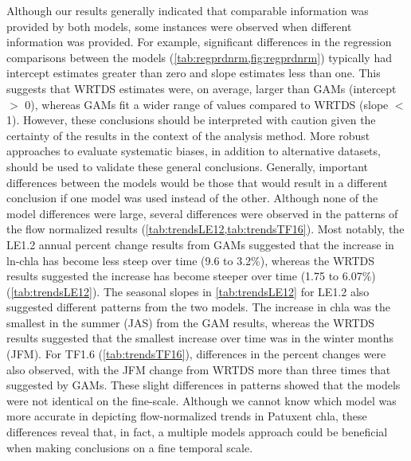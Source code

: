 \documentclass[letterpaper,12pt,oneside]{article}\usepackage[]{graphicx}\usepackage[]{color}
\begin{document}
Although our results generally indicated that comparable information was provided by both models, some instances were observed when different information was provided.  For example, significant differences in the regression comparisons between the models (\cref{tab:regprdnrm,fig:regprdnrm}) typically had intercept estimates greater than zero and slope estimates less than one.  This suggests that \ac{WRTDS} estimates were, on average, larger than \acp{GAM} (intercept $>$ 0), whereas \acp{GAM} fit a wider range of values compared to \ac{WRTDS} (slope $<$ 1). However, these conclusions should be interpreted with caution given the certainty of the results in the context of the analysis method. More robust approaches to evaluate systematic biases, in addition to alternative datasets, should be used to validate these general conclusions.  Generally, important differences between the models would be those that would result in a different conclusion if one model was used instead of the other. Although none of the model differences were large, several differences were observed in the patterns of the flow normalized results (\cref{tab:trendsLE12,tab:trendsTF16}). Most notably, the LE1.2 annual percent change results from \acp{GAM} suggested that the increase in ln-\ac{chla} has become less steep over time (9.6 to 3.2\%), whereas the \ac{WRTDS} results suggested the increase has become steeper over time (1.75 to 6.07\%) (\cref{tab:trendsLE12}). The seasonal slopes in \cref{tab:trendsLE12} for LE1.2 also suggested different patterns from the two models. The increase in \ac{chla} was the smallest in the summer (\ac{JAS}) from the \ac{GAM} results, whereas the \ac{WRTDS} results suggested that the smallest increase over time was in the winter months (\ac{JFM}). For TF1.6 (\cref{tab:trendsTF16}), differences in the percent changes were also observed, with the \ac{JFM} change from \ac{WRTDS} more than three times that suggested by \acp{GAM}. These slight differences in patterns showed that the models were not identical on the fine-scale. Although we cannot know which model was more accurate in depicting flow-normalized trends in Patuxent \ac{chla}, these differences reveal that, in fact, a multiple models approach could be beneficial when making conclusions on a fine temporal scale.
\end{document}
